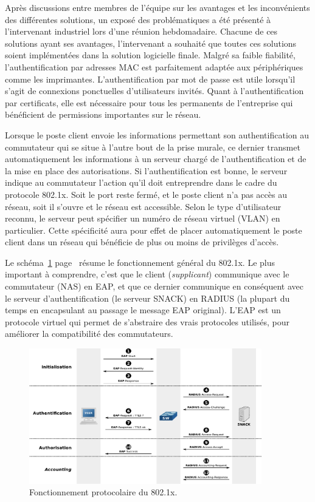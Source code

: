 Après discussions entre membres de l'équipe sur les avantages et les inconvénients des différentes solutions, un exposé des problématiques a été présenté à l'intervenant industriel lors d'une réunion hebdomadaire. Chacune de ces solutions ayant ses avantages, l'intervenant a souhaité que toutes ces solutions soient implémentées dans la solution logicielle finale. Malgré sa faible fiabilité, l'authentification par adresses MAC est parfaitement adaptée aux périphériques comme les imprimantes. L'authentification par mot de passe est utile lorsqu'il s'agit de connexions ponctuelles d'utilisateurs invités. Quant à l'authentification par certificats, elle est nécessaire pour tous les permanents de l'entreprise qui bénéficient de permissions importantes sur le réseau.

Lorsque le poste client envoie les informations permettant son authentification au commutateur qui se situe à l'autre bout de la prise murale, ce dernier transmet automatiquement les informations à un serveur chargé de l'authentification et de la mise en place des autorisations. Si l'authentification est bonne, le serveur indique au commutateur l'action qu'il doit entreprendre dans le cadre du protocole 802.1x. Soit le port reste fermé, et le poste client n'a pas accès au réseau, soit il s'ouvre et le réseau est accessible. Selon le type d'utilisateur reconnu, le serveur peut spécifier un numéro de réseau virtuel (VLAN) en particulier. Cette spécificité aura pour effet de placer automatiquement le poste client dans un réseau qui bénéficie de plus ou moins de privilèges d'accès.

Le schéma~\ref{dot1x} page~\pageref{dot1x} résume le fonctionnement général du 802.1x. Le plus important à comprendre, c'est que le client (\emph{supplicant}) communique avec le commutateur (NAS) en EAP, et que ce dernier communique en conséquent avec le serveur d'authentification (le serveur SNACK) en RADIUS (la plupart du temps en encapsulant au passage le message EAP original). L'EAP est un protocole virtuel qui permet de s'abstraire des vrais protocoles utilisés, pour améliorer la compatibilité des commutateurs.

\begin{figure}[!h]
	\begin{center}
		\includegraphics[width=0.9\textwidth]{img/dot1x-rapport.pdf}
	\end{center}
	\caption{Fonctionnement protocolaire du 802.1x.}
	\label{dot1x}
\end{figure}

